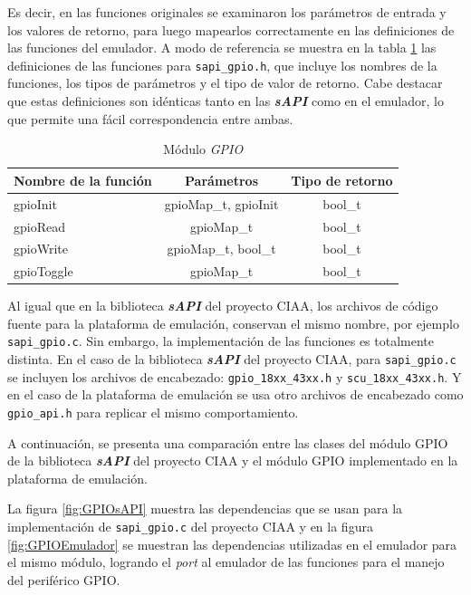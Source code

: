 Es decir, en las funciones originales se examinaron los parámetros de entrada y los valores de retorno, para luego mapearlos correctamente en las definiciones de las funciones del emulador.  A modo de referencia se muestra en la tabla \ref{tab:gpioMap} las definiciones de las funciones para \texttt{sapi\_gpio.h}, que incluye los nombres de la funciones, los tipos de parámetros y el tipo de valor de retorno. Cabe destacar que estas definiciones son idénticas tanto en las \textit{\textbf{sAPI}} como en el emulador, lo que permite una fácil correspondencia entre ambas.


\begin{table}[h]
	\centering
	\caption[Módulo \textit{GPIO}]{Módulo \textit{GPIO}}
	\begin{tabular}{l c c}    
		\toprule
		\textbf{Nombre de la función} 	 & \textbf{Parámetros} 		& \textbf{Tipo de retorno}  \\
		\midrule
		gpioInit & gpioMap\_t, gpioInit				&  bool\_t \\		
		gpioRead	 & gpioMap\_t				&  bool\_t \\
		gpioWrite	 & gpioMap\_t, bool\_t				&  bool\_t \\
		gpioToggle	 & gpioMap\_t				&  bool\_t \\
		\bottomrule
		\hline
	\end{tabular}
	\label{tab:gpioMap}
\end{table}



Al igual que en la biblioteca \textit{\textbf{sAPI}} del proyecto CIAA, los archivos de código fuente para la plataforma de emulación, conservan el mismo nombre, por ejemplo  \texttt{sapi\_gpio.c}. Sin embargo, la implementación de las funciones es totalmente distinta. En el caso de la biblioteca \textit{\textbf{sAPI}} del proyecto CIAA, para \texttt{sapi\_gpio.c}  se incluyen los archivos de encabezado: \texttt{gpio\_18xx\_43xx.h} y \newline \texttt{scu\_18xx\_43xx.h}. Y en el caso de la plataforma de emulación se usa otro archivos de encabezado como \texttt{gpio\_api.h} para replicar el mismo comportamiento.

A continuación, se presenta una comparación entre las clases del módulo GPIO de la biblioteca \textit{\textbf{sAPI}} del proyecto CIAA y el módulo GPIO implementado en la plataforma de emulación. 

La figura \ref{fig:GPIOsAPI} muestra las dependencias que se usan para la implementación de \newline \texttt{sapi\_gpio.c} del proyecto CIAA y en la figura \ref{fig:GPIOEmulador} se muestran las dependencias utilizadas en el emulador para el mismo módulo, logrando el \textit{port} al emulador de las funciones para el manejo del periférico GPIO.


